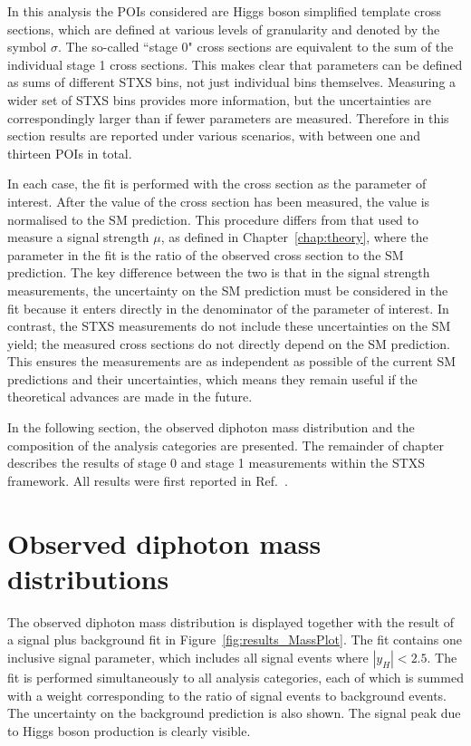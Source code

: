 In this analysis the POIs considered are Higgs boson simplified template cross sections, 
which are defined at various levels of granularity and denoted by the symbol $\sigma$.
The so-called ``stage 0" cross sections are equivalent 
to the sum of the individual stage 1 cross sections.
This makes clear that parameters can be defined as sums of different STXS bins, 
not just individual bins themselves.
Measuring a wider set of STXS bins provides more information, 
but the uncertainties are correspondingly larger than if fewer parameters are measured.
Therefore in this section results are reported under various scenarios, 
with between one and thirteen POIs in total.

In each case, the fit is performed with the cross section as the parameter of interest.
After the value of the cross section has been measured, the value is normalised to the SM prediction. 
This procedure differs from that used to measure a signal strength $\mu$, 
as defined in Chapter~\ref{chap:theory},
where the parameter in the fit is the ratio of the observed cross section to the SM prediction.
The key difference between the two is that in the signal strength measurements,
the uncertainty on the SM prediction must be considered in the fit
because it enters directly in the denominator of the parameter of interest.
In contrast, the STXS measurements do not include these uncertainties on the SM yield;
the measured cross sections do not directly depend on the SM prediction.
This ensures the measurements are as independent as possible of the current SM predictions
and their uncertainties, 
which means they remain useful if the theoretical advances are made in the future.

In the following section, the observed diphoton mass distribution
and the composition of the analysis categories are presented.
The remainder of chapter describes the results of stage 0 and stage 1 measurements 
within the STXS framework.
All results were first reported in Ref.~\cite{HIG-18-029}.

\section{Observed diphoton mass distributions}

The observed diphoton mass distribution is displayed together with the result 
of a signal plus background fit in Figure~\ref{fig:results_MassPlot}.
The fit contains one inclusive signal parameter, 
which includes all signal events where $|y_H| < 2.5$.
The fit is performed simultaneously to all analysis categories, 
each of which is summed with a weight 
corresponding to the ratio of signal events to background events. %
The uncertainty on the background prediction is also shown.
The signal peak due to Higgs boson production is clearly visible.

